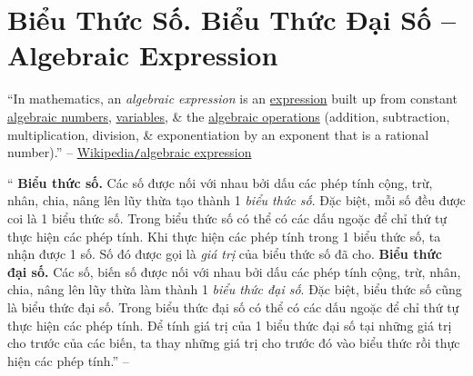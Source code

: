 \documentclass{article}
\numberwithin{equation}{section}
\begin{document}

\section{Biểu Thức Số. Biểu Thức Đại Số -- Algebraic Expression}
``In mathematics, an \textit{algebraic expression} is an \href{https://en.wikipedia.org/wiki/Expression_(mathematics)}{expression} built up from constant \href{https://en.wikipedia.org/wiki/Algebraic_number}{algebraic numbers}, \href{https://en.wikipedia.org/wiki/Variable_(mathematics)}{variables}, \& the \href{https://en.wikipedia.org/wiki/Algebraic_operation}{algebraic operations} (addition, subtraction, multiplication, division, \& exponentiation by an exponent that is a rational number).'' -- \href{https://en.wikipedia.org/wiki/Algebraic_expression}{Wikipedia\texttt{/}algebraic expression}

`` \textbf{Biểu thức số.} Các số được nối với nhau bởi dấu các phép tính cộng, trừ, nhân, chia, nâng lên lũy thừa tạo thành 1 \textit{biểu thức số}. Đặc biệt, mỗi số đều được coi là 1 biểu thức số. Trong biểu thức số có thể có các dấu ngoặc để chỉ thứ tự thực hiện các phép tính. Khi thực hiện các phép tính trong 1 biểu thức số, ta nhận được 1 số. Số đó được gọi là \textit{giá trị} của biểu thức số đã cho.  \textbf{Biểu thức đại số.} Các số, biến số được nối với nhau bởi dấu các phép tính cộng, trừ, nhân, chia, nâng lên lũy thừa làm thành 1 \textit{biểu thức đại số}. Đặc biệt, biểu thức số cũng là biểu thức đại số. Trong biểu thức đại số có thể có các dấu ngoặc để chỉ thứ tự thực hiện các phép tính. Để tính giá trị của 1 biểu thức đại số tại những giá trị cho trước của các biến, ta thay những giá trị cho trước đó vào biểu thức rồi thực hiện các phép tính.'' -- \cite[Chap. VI, \S1, p. 35]{SBT_Toan_7_Canh_Dieu_tap_2}
\end{document}
